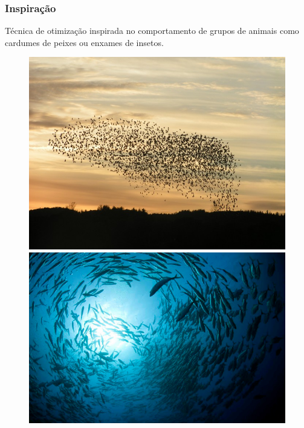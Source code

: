 \documentclass{beamer}
\begin{document}
\begin{frame}
\frametitle{Inspiração}
Técnica de otimização inspirada no comportamento de grupos de animais como cardumes de peixes ou enxames de insetos.
\begin{figure}[htbp]
  \begin{minipage}[b]{0.4\linewidth}
    \centering
    \includegraphics[width=\linewidth]{birds.jpg}
  \end{minipage}
  \hspace{0.5cm}
  \begin{minipage}[b]{0.4\linewidth}
    \centering
    \includegraphics[width=\linewidth]{fish.jpg}
  \end{minipage}
\end{figure}
\end{frame}
\end{document}
